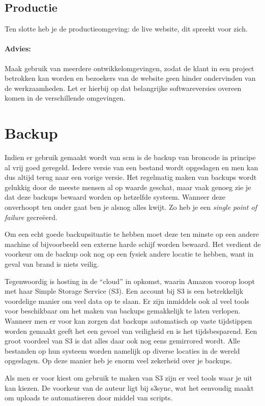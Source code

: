 \subsection{Productie}
Ten slotte heb je de productieomgeving: de live website, dit spreekt voor zich.

\paragraph{Advies:} Maak gebruik van meerdere ontwikkelomgevingen, zodat de klant in een project betrokken kan worden en bezoekers van de website geen hinder ondervinden van de werkzaamheden. Let er hierbij op dat belangrijke softwareversies overeen komen in de verschillende omgevingen.

\section{Backup}

Indien er gebruik gemaakt wordt van {\sc scm} is de backup van broncode in principe al vrij goed geregeld. Iedere versie van een bestand wordt opgeslagen en men kan dus altijd terug naar een vorige versie. Het regelmatig maken van backups wordt gelukkig door de meeste mensen al op waarde geschat, maar vaak genoeg zie je dat deze backups bewaard worden op hetzelfde systeem. Wanneer deze onverhoopt ten onder gaat ben je alsnog alles kwijt. Zo heb je een  \emph{single point of failure} gecreëerd.

Om een echt goede backupsituatie te hebben moet deze ten minste op een andere machine of bijvoorbeeld een externe harde schijf worden bewaard. Het verdient de voorkeur om de backup ook nog op een fysiek andere locatie te hebben, want in geval van brand is niets veilig.

Tegenwoordig is hosting in de ``cloud'' in opkomst, waarin Amazon voorop loopt met haar Simple Storage Service (S3). Een account bij S3 is een betrekkelijk voordelige manier om veel data op te slaan. Er zijn inmiddels ook al veel tools voor beschikbaar om het maken van backups gemakkelijk te laten verlopen. Wanneer men er voor kan zorgen dat backups automatisch op vaste tijdstippen worden gemaakt geeft het een gevoel van veiligheid en is het tijdsbesparend. Een groot voordeel van S3 is dat alles daar ook nog eens gemirrored wordt. Alle bestanden op hun systeem worden namelijk op diverse locaties in de wereld opgeslagen. Op deze manier heb je enorm veel zekerheid over je backups.

Als men er voor kiest om gebruik te maken van S3 zijn er veel tools waar je uit kan kiezen.\cite{amazontools} De voorkeur van de auteur ligt bij s3sync\cite{s3sync}, wat het eenvoudig maakt om uploads te automatiseren door middel van scripts.


